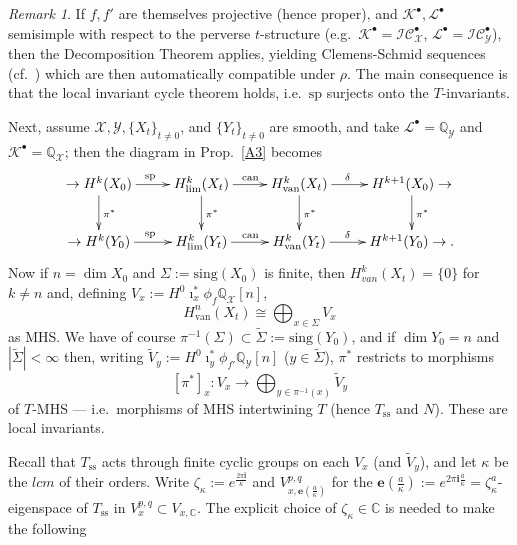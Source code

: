 \documentclass[12pt,letterpaper,english]{amsart}
\numberwithin{equation}{section}
\numberwithin{figure}{section}
\theoremstyle{plain}
\theoremstyle{remark}
\newtheorem{rem}[equation]{Remark}
\theoremstyle{definition}
\theoremstyle{definition}
\theoremstyle{plain}
\theoremstyle{plain}
\theoremstyle{plain}
\theoremstyle{plain}
\theoremstyle{definition}
\def\ay{\mathbb{i}}
\def\QQ{\mathbb{Q}}
\def\CC{\mathbb{C}}
\def\b{\bullet}
\def\Y{\mathcal{Y}}
\def\X{\mathcal{X}}
\def\Y{\mathcal{Y}}
\def\ay{\mathbf{i}}
\def\K{\mathcal{K}}
\def\L{\mathcal{L}}
\def\sp{\mathrm{sp}}
\def\can{\mathrm{can}}
\def\van{\mathrm{van}}
\def\be{\mathbf{e}}
\def\f{f'}
\theoremstyle{definition}
\begin{document}
\begin{rem}\label{A4}
If $f,\f$ are themselves projective (hence proper), and $\K^{\b},\L^{\b}$ semisimple with respect to the perverse $t$-structure (e.g.~$\K^{\b}=\mathcal{IC}_{\X}^{\b}$, $\L^{\b}=\mathcal{IC}_{\Y}^{\b}$), then the Decomposition Theorem applies, yielding Clemens-Schmid sequences (cf.~\cite[\S5]{KL1}) which are then automatically compatible under $\rho$. The main consequence is that the local invariant cycle theorem holds, i.e.~$\sp$ surjects onto the $T$-invariants.
\end{rem}

Next, assume $\X,\Y,\{X_t\}_{t\neq 0}$, and $\{Y_t\}_{t\neq 0}$ are smooth, and take $\L^{\b}=\QQ_{\Y}$ and $\K^{\b}=\QQ_{\X}$; then the diagram in Prop.~\ref{A3} becomes 
\begin{equation}\label{A5}
\xymatrix{\to H^k(X_0) \ar [r]^{\sp} \ar [d]^{\pi^*} & H^k_{\lim}(X_t) \ar [r]^{\can} \ar [d]^{\pi^*} & H^k_{\van}(X_t) \ar [r]^{\delta\mspace{25mu}} \ar [d]^{\pi^*} & H^{k+1}(X_0) \to \ar [d]^{\pi^*} \\ \to H^k(Y_0) \ar [r]^{\sp}  & H^k_{\lim}(Y_t) \ar [r]^{\can}  & H^k_{\van}(Y_t) \ar [r]^{\delta\mspace{25mu}}  & H^{k+1}(Y_0) \to .}
\end{equation}
Now if $n=\dim X_0$ and $\Sigma:=\mathrm{sing}(X_0)$ is finite, then $H^k_{van}(X_t)=\{0\}$ for $k\neq n$ and, defining $V_x:=H^0\imath_x^*\phi_f\QQ_{\X}[n]$, 
\begin{equation}\label{A6}
H^n_{\van}(X_t)\cong \textstyle \bigoplus_{x\in \Sigma} V_x
\end{equation}
as MHS.  We have of course $\pi^{-1}(\Sigma)\subset \widetilde{\Sigma}:=\mathrm{sing}(Y_0)$, and if $\dim Y_0 = n$ and $|\widetilde{\Sigma}|<\infty$ then, writing $\widetilde{V}_y:=H^0\imath_y^*\phi_{\f}\QQ_{\Y}[n]$ ($y\in \widetilde{\Sigma}$), $\pi^*$ restricts to morphisms
\begin{equation}\label{A7}
[\pi^*]_x\colon V_x\to \textstyle\bigoplus_{y\in \pi^{-1}(x)}\widetilde{V}_y 
\end{equation}
of $T$-MHS --- i.e.~morphisms of MHS intertwining $T$ (hence $T_{\mathrm{ss}}$ and $N$).  These are local invariants.

Recall that $T_{\mathrm{ss}}$ acts through finite cyclic groups on each $V_x$ (and $\widetilde{V}_y$), and let $\kappa$ be the $lcm$ of their orders.  Write $\zeta_{\kappa}:=e^{\frac{2\pi\ay}{\kappa}}$ and $V_{x,\be(\frac{a}{\kappa})}^{p,q}$ for the $\be(\tfrac{a}{\kappa}):=e^{2\pi\ay\frac{a}{\kappa}}=\zeta_{\kappa}^a$-eigenspace of $T_{\mathrm{ss}}$ in $V_x^{p,q}\subset V_{x,\CC}$.  The explicit choice of $\zeta_{\kappa}\in \CC$ is needed to make the following
\end{document}
